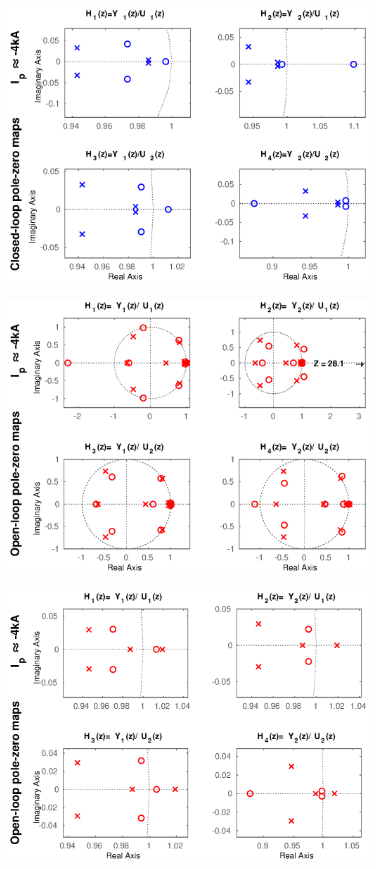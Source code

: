 \begin{figure}
	\centering
	\includegraphics[width=0.85\textwidth]{Chp5/PoleZero/PoleZeroCloseNegZoom.eps}
	\label{PoleZeroCloseNegZoom}
\end{figure}	


\begin{figure}
	\centering
	\includegraphics[width=0.85\textwidth]{Chp5/PoleZero/PoleZeroOpenNeg.eps}
	\label{PoleZeroOpenNeg}
\end{figure}	

\begin{figure}
	\centering
	\includegraphics[width=0.85\textwidth]{Chp5/PoleZero/PoleZeroOpenNegZoom.eps}
	\label{PoleZeroOpenNegZoom}
\end{figure}


